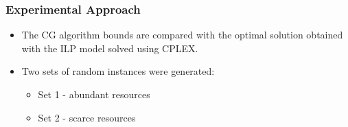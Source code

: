 \documentclass[english]{beamer}
\begin{document}
\begin{frame}
\frametitle{Experimental Approach}
\begin{itemize}
  \item The CG algorithm bounds are compared with the optimal solution obtained with the ILP model solved using CPLEX.

  \item Two sets of random instances were generated:
    \begin{itemize}
      \item Set 1 - abundant resources
      \item Set 2 - scarce resources
    \end{itemize}
  

\end{itemize}
\end{frame}
\end{document}
